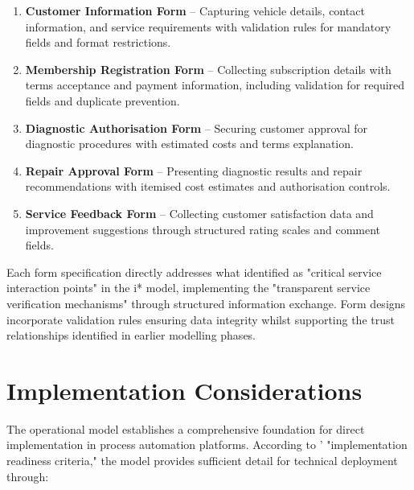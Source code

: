 \documentclass[14pt,a4paper]{article}
\begin{document}
\begin{enumerate}
    \item \textbf{Customer Information Form} – Capturing vehicle details, contact information, and service requirements with validation rules for mandatory fields and format restrictions.

    \item \textbf{Membership Registration Form} – Collecting subscription details with terms acceptance and payment information, including validation for required fields and duplicate prevention.

    \item \textbf{Diagnostic Authorisation Form} – Securing customer approval for diagnostic procedures with estimated costs and terms explanation.

    \item \textbf{Repair Approval Form} – Presenting diagnostic results and repair recommendations with itemised cost estimates and authorisation controls.

    \item \textbf{Service Feedback Form} – Collecting customer satisfaction data and improvement suggestions through structured rating scales and comment fields.
\end{enumerate}

Each form specification directly addresses what \textit{\parencite[p. 76]{Rifaut2020}} identified as "critical service interaction points" in the i* model, implementing the "transparent service verification mechanisms" through structured information exchange. Form designs incorporate validation rules ensuring data integrity whilst supporting the trust relationships identified in earlier modelling phases.

\section{Implementation Considerations}

The operational model establishes a comprehensive foundation for direct implementation in process automation platforms. According to \textit{\parencite[p. 227]{Burns2023}}' "implementation readiness criteria," the model provides sufficient detail for technical deployment through:
\end{document}
